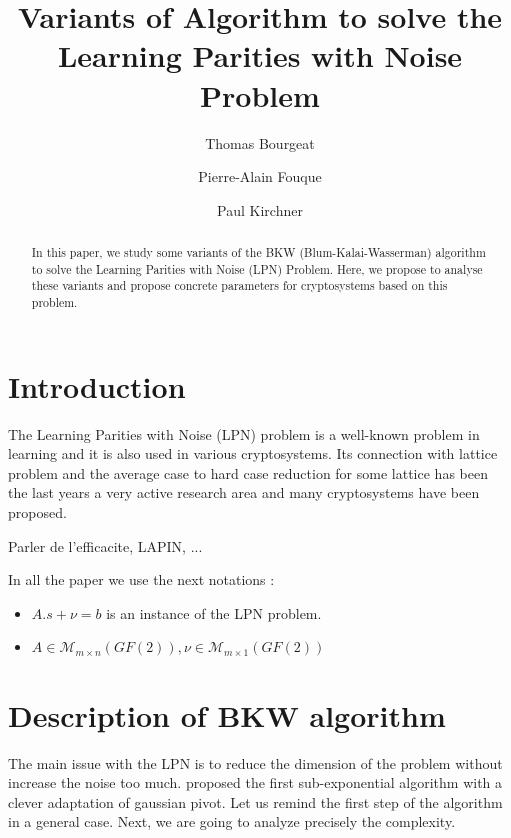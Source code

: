\documentclass{llncs}		%
\begin{document}
\title{Variants of Algorithm to solve the Learning Parities with Noise Problem}
\author{Thomas Bourgeat \and Pierre-Alain Fouque \and Paul Kirchner}

\maketitle

\begin{abstract}
In this paper, we study some variants of the BKW (Blum-Kalai-Wasserman) algorithm to solve the Learning Parities with Noise (LPN) Problem. Here, we propose to analyse these variants and propose concrete parameters for cryptosystems based on this problem. 
\end{abstract}

\section{Introduction}
The Learning Parities with Noise (LPN) problem is 
a well-known problem in learning and it is also used 
in various cryptosystems. 
Its connection with lattice problem and the average case to hard
 case reduction for some lattice has been the last years
 a very active research area and many cryptosystems have been proposed. 

Parler de l'efficacite, LAPIN, ... 

In all the paper we use the next notations :
\begin{itemize}
\item $A.s+\nu = b$ is an instance of the LPN problem.
\item $A\in \mathcal{M}_{m\times n}(GF(2)), \nu\in \mathcal{M}_{m\times
1}(GF(2))$
\end{itemize}

\section{Description of BKW algorithm}
The main issue with the LPN is to reduce the dimension of the problem without
increase the noise too much. \cite{BKW} proposed the first sub-exponential
algorithm with a clever adaptation of gaussian pivot. Let us remind the first
step of the algorithm in a general case. Next, we are going to analyze precisely
the complexity.
\end{document}
